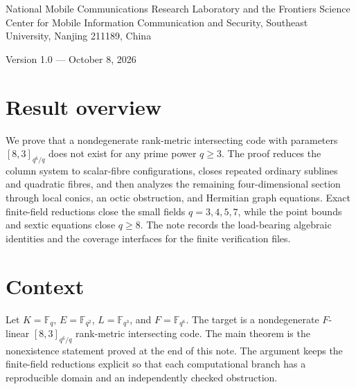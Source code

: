 \documentclass[12pt,letterpaper,onecolumn]{article}
\theoremstyle{definition}
\theoremstyle{remark}
\begin{document}
\par\medskip
{}\medskip
{}\par\smallskip
\noindent\begin{minipage}{\linewidth}\small National Mobile Communications Research Laboratory and the Frontiers Science Center for Mobile Information Communication and Security, Southeast University, Nanjing 211189, China\end{minipage}\par\medskip
\noindent Version 1.0 --- October 8, 2026\par\bigskip
{}

\section*{Result overview}
We prove that a nondegenerate rank-metric intersecting code with parameters
\([8,3]_{q^6/q}\) does not exist for any prime power \(q\ge3\).  The proof
reduces the column system to scalar-fibre configurations, closes repeated
ordinary sublines and quadratic fibres, and then analyzes the remaining
four-dimensional section through local conics, an octic obstruction, and
Hermitian graph equations.  Exact finite-field reductions close the small
fields \(q=3,4,5,7\), while the point bounds and sextic equations close
\(q\ge8\).  The note records the load-bearing algebraic identities and the
coverage interfaces for the finite verification files.

    \section{Context}
Let \(K=\mathbb F_q\), \(E=\mathbb F_{q^2}\), \(L=\mathbb F_{q^3}\), and
\(F=\mathbb F_{q^6}\).  The target is a nondegenerate \(F\)-linear
\([8,3]_{q^6/q}\) rank-metric intersecting code.  The main theorem is the
nonexistence statement proved at the end of this note.  The argument keeps
the finite-field reductions explicit so that each computational branch has
a reproducible domain and an independently checked obstruction.
    
\end{document}
